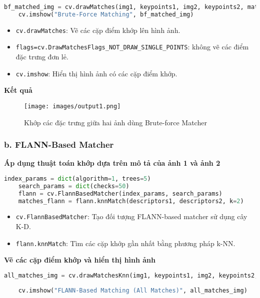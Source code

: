 \begin{lstlisting}[language=Python]
	bf_matched_img = cv.drawMatches(img1, keypoints1, img2, keypoints2, matches_bf[:50], None, flags=cv.DrawMatchesFlags_NOT_DRAW_SINGLE_POINTS)
	cv.imshow("Brute-Force Matching", bf_matched_img)
\end{lstlisting}

\begin{itemize}
	\item \texttt{cv.drawMatches}: Vẽ các cặp điểm khớp lên hình ảnh.
	\item \texttt{flags=cv.DrawMatchesFlags\_NOT\_DRAW\_SINGLE\_POINTS}: không vẽ các điểm đặc trưng đơn lẻ.
	\item \texttt{cv.imshow}: Hiển thị hình ảnh có các cặp điểm khớp.
\end{itemize}
\textbf{Kết quả}
\begin{figure}[H]
	\centering
	\texttt{[image: images/output1.png]}
	\caption{Khớp các đặc trưng giữa hai ảnh dùng Brute-force Matcher}
\end{figure}

\subsubsection*{b. FLANN-Based Matcher}

\textbf{Áp dụng thuật toán khớp dựa trên mô tả của ảnh 1 và ảnh 2}

\begin{lstlisting}[language=Python]
	index_params = dict(algorithm=1, trees=5)
	search_params = dict(checks=50)
	flann = cv.FlannBasedMatcher(index_params, search_params)
	matches_flann = flann.knnMatch(descriptors1, descriptors2, k=2)
\end{lstlisting}

\begin{itemize}
	\item \texttt{cv.FlannBasedMatcher}: Tạo đối tượng FLANN-based matcher sử dụng cây K-D.
	\item \texttt{flann.knnMatch}: Tìm các cặp khớp gần nhất bằng phương pháp k-NN.
\end{itemize}
\textbf{Vẽ các cặp điểm khớp và hiển thị hình ảnh}

\begin{lstlisting}[language=Python]
    all_matches_img = cv.drawMatchesKnn(img1, keypoints1, img2, keypoints2, matches_flann[:50], None, flags=cv.DrawMatchesFlags_NOT_DRAW_SINGLE_POINTS)
    
	cv.imshow("FLANN-Based Matching (All Matches)", all_matches_img)
\end{lstlisting}


